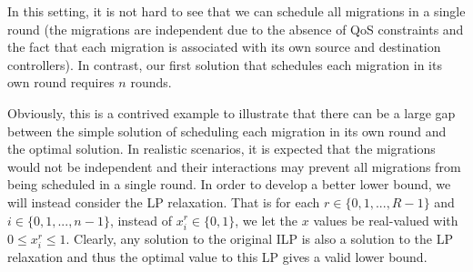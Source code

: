 \documentclass[conference]{IEEEtran}
\begin{document}
In this setting, it is not hard to see that we can schedule all migrations in a single round (the migrations are independent due to the absence of QoS constraints and the fact that each migration is associated with its own source and destination controllers). In contrast, our first solution that schedules each migration in its own round requires $n$ rounds.

Obviously, this is a contrived example to illustrate that there can be a large gap between the simple solution of scheduling each migration in its own round and the optimal solution. In realistic scenarios, it is expected that the migrations would not be independent and their interactions may prevent all migrations from being scheduled in a single round. In order to develop a better lower bound, we will instead consider the LP relaxation. That is for each $r \in \{0, 1, ..., R - 1\}$ and $i \in \{0, 1, ..., n - 1\}$, instead of $x^{r}_{i} \in \{0, 1\}$, we let the $x$ values be real-valued with $0 \leq x^{r}_{i} \leq 1$. Clearly, any solution to the original ILP is also a solution to the LP relaxation and thus the optimal value to this LP gives a valid lower bound.




% 
% 


\end{document}

